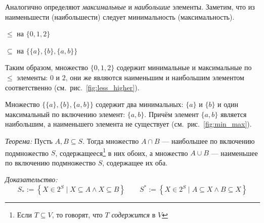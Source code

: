 Аналогично определяют {\it максимальные} и {\it наибольшие} элементы.
Заметим, что из наименьшести (наибольшести) следует минимальность (максимальность).

\begin{marginfigure}
  \center

  \caption{$\leq$ на $\{0,1,2\}$}\label{fig:less_higher}
\end{marginfigure}

\begin{marginfigure}
  \center

  \caption{$\subseteq$ на $\{\{a\},\{b\},\{a,b\}\}$}\label{fig:min_max}
\end{marginfigure}

Таким образом, множество $\{0,1,2\}$ содержит минимальные и максимальные по $\leq$
элементы: $0$ и $2$, они же являются наименьшим и
наибольшим элементом соответственно (см.~рис.~\ref{fig:less_higher}).

Множество $\{\{a\},\{b\},\{a,b\}\}$ содержит
два минимальных: $\{a\}$ и $\{b\}$ и один максимальный
по включению элемент: $\{a,b\}$. Причём элемент $\{a,b\}$ является наибольшим, а
наименьшего элемента не существует (см.~рис.~\ref{fig:min_max}).

\pagebreak
{\it Теорема:} Пусть $A,B\subseteq S$. Тогда множество $A\cap B$ ---
наибольшее по включению подмножество $S$, содержащееся\footnote{Если $T\subseteq V$,
  то говорят, что $T$ {\it содержится}
  в $V$} в них обоих,
а множество $A\cup B$ --- наименьшее по включению подмножество $S$,
содержащее их оба.

{\it Доказательство:}
\[
  S_{*}:=\left\{X\in 2^{S}\;\big|\; X\subseteq A\land X\subseteq B\right\}\qquad
  S^{*}:=\left\{X\in 2^{S}\;\big|\; A\subseteq X\land B\subseteq X\right\}
\]

